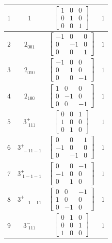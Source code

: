 \documentclass[fleqn,8pt]{jsarticle}
\begin{document}
\begin{longtable}{cccc}
$ 1 $ & $ 1 $ & $ \begin{bmatrix} 1 & 0 & 0 \\ 0 & 1 & 0 \\ 0 & 0 & 1 \end{bmatrix} $ & $ 1 $ \\ \hline
$ 2 $ & $ 2{}_{001} $ & $ \begin{bmatrix} -1 & 0 & 0 \\ 0 & -1 & 0 \\ 0 & 0 & 1 \end{bmatrix} $ & $ 1 $ \\ \hline
$ 3 $ & $ 2{}_{010} $ & $ \begin{bmatrix} -1 & 0 & 0 \\ 0 & 1 & 0 \\ 0 & 0 & -1 \end{bmatrix} $ & $ 1 $ \\ \hline
$ 4 $ & $ 2{}_{100} $ & $ \begin{bmatrix} 1 & 0 & 0 \\ 0 & -1 & 0 \\ 0 & 0 & -1 \end{bmatrix} $ & $ 1 $ \\ \hline
$ 5 $ & $ 3^{+}_{\,\,111} $ & $ \begin{bmatrix} 0 & 0 & 1 \\ 1 & 0 & 0 \\ 0 & 1 & 0 \end{bmatrix} $ & $ 1 $ \\ \hline
$ 6 $ & $ 3^{+}_{\,\,-11-1} $ & $ \begin{bmatrix} 0 & 0 & 1 \\ -1 & 0 & 0 \\ 0 & -1 & 0 \end{bmatrix} $ & $ 1 $ \\ \hline
$ 7 $ & $ 3^{+}_{\,\,1-1-1} $ & $ \begin{bmatrix} 0 & 0 & -1 \\ -1 & 0 & 0 \\ 0 & 1 & 0 \end{bmatrix} $ & $ 1 $ \\ \hline
$ 8 $ & $ 3^{+}_{\,\,-1-11} $ & $ \begin{bmatrix} 0 & 0 & -1 \\ 1 & 0 & 0 \\ 0 & -1 & 0 \end{bmatrix} $ & $ 1 $ \\ \hline
$ 9 $ & $ 3^{-}_{\,\,111} $ & $ \begin{bmatrix} 0 & 1 & 0 \\ 0 & 0 & 1 \\ 1 & 0 & 0 \end{bmatrix} $ & $ 1 $ \\ \hline

\end{longtable}
\end{document}
